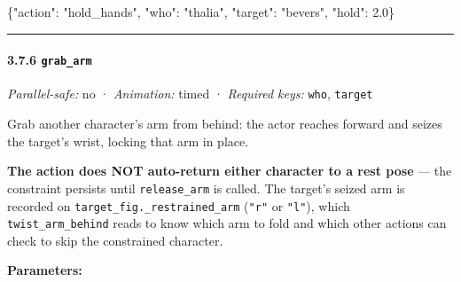 \documentclass[
  12pt,
  letterpaper,
]{book}
\newenvironment{Shaded}{}{}
\newcommand{\DataTypeTok}[1]{\textcolor[rgb]{0.56,0.13,0.00}{#1}}
\newcommand{\FloatTok}[1]{\textcolor[rgb]{0.25,0.63,0.44}{#1}}
\newcommand{\FunctionTok}[1]{\textcolor[rgb]{0.02,0.16,0.49}{#1}}
\newcommand{\StringTok}[1]{\textcolor[rgb]{0.25,0.44,0.63}{#1}}
\begin{document}
\begin{Shaded}
\begin{Highlighting}[]
\FunctionTok{\{}\DataTypeTok{"action"}\FunctionTok{:} \StringTok{"hold\_hands"}\FunctionTok{,} \DataTypeTok{"who"}\FunctionTok{:} \StringTok{"thalia"}\FunctionTok{,} \DataTypeTok{"target"}\FunctionTok{:} \StringTok{"bevers"}\FunctionTok{,} \DataTypeTok{"hold"}\FunctionTok{:} \FloatTok{2.0}\FunctionTok{\}}
\end{Highlighting}
\end{Shaded}

\begin{center}\rule{0.5\linewidth}{0.5pt}\end{center}

\paragraph{\texorpdfstring{3.7.6
\texttt{grab\_arm}}{3.7.6 grab\_arm}}\label{grab_arm}

\emph{Parallel-safe:} no · \emph{Animation:} timed · \emph{Required
keys:} \texttt{who}, \texttt{target}

Grab another character's arm from behind: the actor reaches forward and
seizes the target's wrist, locking that arm in place.

\textbf{The action does NOT auto-return either character to a rest pose}
--- the constraint persists until \texttt{release\_arm} is called. The
target's seized arm is recorded on
\texttt{target\_fig.\_restrained\_arm} (\texttt{"r"} or \texttt{"l"}),
which \texttt{twist\_arm\_behind} reads to know which arm to fold and
which other actions can check to skip the constrained character.

\textbf{Parameters:}
\end{document}
